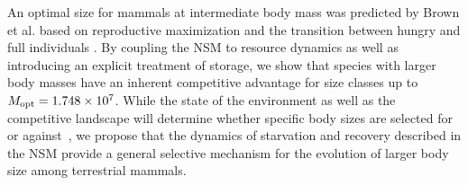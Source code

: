 \documentclass[twocolumn,preprintnumbers,amsmath,amssymb,superscriptaddress]{revtex4}
\begin{document}
An optimal size for mammals at intermediate body mass was predicted by Brown et al. based on reproductive maximization and the transition between hungry and full individuals \cite{Brown:1993p708}. 
By coupling the NSM to resource dynamics as well as introducing an explicit treatment of storage, we show that species with larger body masses have an inherent competitive advantage for size classes up to $M_{\rm opt}= 1.748\times10^7$.
While the state of the environment as well as the competitive landscape will determine whether specific body sizes are selected for or against~\citep{Saarinen:2014br}, we propose that the dynamics of starvation and recovery described in the NSM provide a general selective mechanism for the evolution of larger body size among terrestrial mammals.\\

 \\



\end{document}
